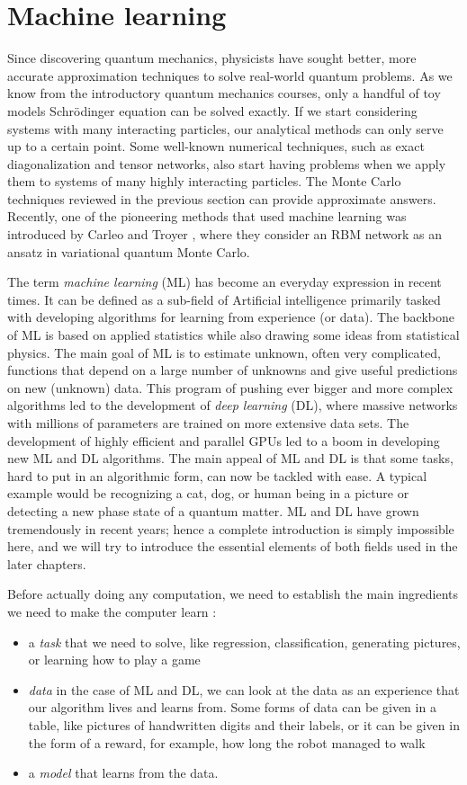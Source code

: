 \section{Machine learning}
Since discovering quantum mechanics, physicists have sought better, more accurate approximation techniques to solve real-world quantum problems. As we know from the introductory quantum mechanics courses, only a handful of toy models Schr\"{o}dinger equation can be solved exactly. If we start considering systems with many interacting particles, our analytical methods can only serve up to a certain point. Some well-known numerical techniques, such as exact diagonalization and tensor networks, also start having problems when we apply them to systems of many highly interacting particles. The Monte Carlo techniques reviewed in the previous section can provide approximate answers. Recently, one of the pioneering methods that used machine learning was introduced by Carleo and Troyer \cite{carleoTroyer}, where they consider an RBM network as an ansatz in variational quantum Monte Carlo.
\par
The term \textit{machine learning} (ML) has become an everyday expression in recent times. It can be defined as a sub-field of Artificial intelligence primarily tasked with developing algorithms for learning from experience (or data). The backbone of ML is based on applied statistics while also drawing some ideas from statistical physics. The main goal of ML is to estimate unknown, often very complicated, functions that depend on a large number of unknowns and give useful predictions on new (unknown) data. This program of pushing ever bigger and more complex algorithms led to the development of \textit{deep learning} (DL), where massive networks with millions of parameters are trained on more extensive data sets. The development of highly efficient and parallel GPUs led to a boom in developing new ML and DL algorithms. The main appeal of ML and DL is that some tasks, hard to put in an algorithmic form, can now be tackled with ease. A typical example would be recognizing a cat, dog, or human being in a picture or detecting a new phase state of a quantum matter. ML and DL have grown tremendously in recent years; hence a complete introduction is simply impossible here, and we will try to introduce the essential elements of both fields used in the later chapters.
\par 
Before actually doing any computation, we need to establish the main ingredients we need to make the computer learn \cite{MLintro}:
\begin{itemize}
	\item a \textit{task} that we need to solve, like regression, classification, generating pictures, or learning how to play a game
	\item \textit{data} in the case of ML and DL, we can look at the data as an experience that our algorithm lives and learns from. Some forms of data can be given in a table, like pictures of handwritten digits and their labels, or it can be given in the form of a reward, for example, how long the robot managed to walk
	\item a \textit{model} that learns from the data.
\end{itemize}
